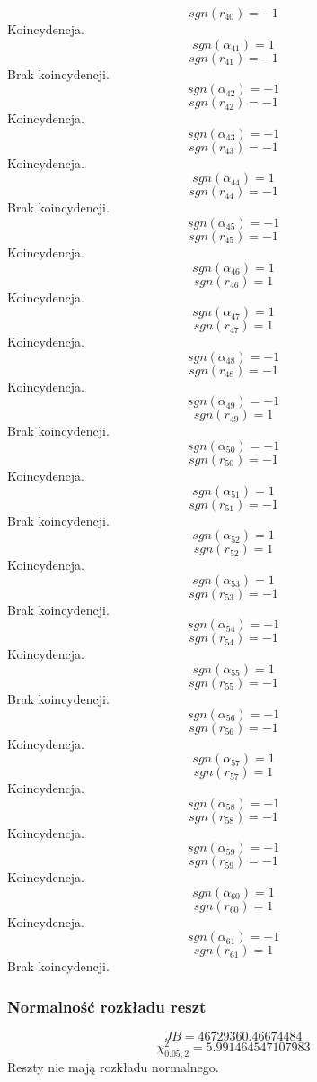 \[sgn(r_{40}) = -1\]
Koincydencja.
\[sgn(\alpha_{41}) = 1\]
\[sgn(r_{41}) = -1\]
Brak koincydencji.
\[sgn(\alpha_{42}) = -1\]
\[sgn(r_{42}) = -1\]
Koincydencja.
\[sgn(\alpha_{43}) = -1\]
\[sgn(r_{43}) = -1\]
Koincydencja.
\[sgn(\alpha_{44}) = 1\]
\[sgn(r_{44}) = -1\]
Brak koincydencji.
\[sgn(\alpha_{45}) = -1\]
\[sgn(r_{45}) = -1\]
Koincydencja.
\[sgn(\alpha_{46}) = 1\]
\[sgn(r_{46}) = 1\]
Koincydencja.
\[sgn(\alpha_{47}) = 1\]
\[sgn(r_{47}) = 1\]
Koincydencja.
\[sgn(\alpha_{48}) = -1\]
\[sgn(r_{48}) = -1\]
Koincydencja.
\[sgn(\alpha_{49}) = -1\]
\[sgn(r_{49}) = 1\]
Brak koincydencji.
\[sgn(\alpha_{50}) = -1\]
\[sgn(r_{50}) = -1\]
Koincydencja.
\[sgn(\alpha_{51}) = 1\]
\[sgn(r_{51}) = -1\]
Brak koincydencji.
\[sgn(\alpha_{52}) = 1\]
\[sgn(r_{52}) = 1\]
Koincydencja.
\[sgn(\alpha_{53}) = 1\]
\[sgn(r_{53}) = -1\]
Brak koincydencji.
\[sgn(\alpha_{54}) = -1\]
\[sgn(r_{54}) = -1\]
Koincydencja.
\[sgn(\alpha_{55}) = 1\]
\[sgn(r_{55}) = -1\]
Brak koincydencji.
\[sgn(\alpha_{56}) = -1\]
\[sgn(r_{56}) = -1\]
Koincydencja.
\[sgn(\alpha_{57}) = 1\]
\[sgn(r_{57}) = 1\]
Koincydencja.
\[sgn(\alpha_{58}) = -1\]
\[sgn(r_{58}) = -1\]
Koincydencja.
\[sgn(\alpha_{59}) = -1\]
\[sgn(r_{59}) = -1\]
Koincydencja.
\[sgn(\alpha_{60}) = 1\]
\[sgn(r_{60}) = 1\]
Koincydencja.
\[sgn(\alpha_{61}) = -1\]
\[sgn(r_{61}) = 1\]
Brak koincydencji.
\subsubsection{Normalność rozkładu reszt}
\[JB = 46729360.46674484\]
\[\chi^2_{0.05, 2} = 5.991464547107983\]
Reszty nie mają rozkładu normalnego.
